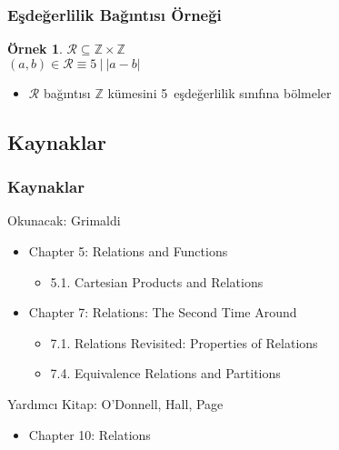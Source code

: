 \documentclass[dvipsnames]{beamer}
\theoremstyle{definition}
\theoremstyle{example}
\newtheorem{ornek}[theorem]{Örnek}
\theoremstyle{plain}
\begin{document}
\begin{frame}
  \frametitle{Eşdeğerlilik Bağıntısı Örneği}

  \begin{ornek}
    $\mathcal{R} \subseteq \mathbb{Z} \times \mathbb{Z}$\\
    $(a,b) \in \mathcal{R} \equiv 5~|~|a - b|$

    \bigskip
    \begin{itemize}
      \item $\mathcal{R}$ bağıntısı $\mathbb{Z}$ kümesini 5~eşdeğerlilik sınıfına
        bölmeler
    \end{itemize}
  \end{ornek}
\end{frame}

\subsection*{Kaynaklar}

\begin{frame}
  \frametitle{Kaynaklar}

  \begin{block}{Okunacak: Grimaldi}
    \begin{itemize}
      \item Chapter 5: Relations and Functions
      \begin{itemize}
        \item 5.1. \alert{Cartesian Products and Relations}
      \end{itemize}
      \item Chapter 7: Relations: The Second Time Around
      \begin{itemize}
        \item 7.1. \alert{Relations Revisited: Properties of Relations}
        \item 7.4. \alert{Equivalence Relations and Partitions}
      \end{itemize}
    \end{itemize}
  \end{block}

  \begin{block}{Yardımcı Kitap: O'Donnell, Hall, Page}
    \begin{itemize}
      \item Chapter 10: Relations
    \end{itemize}
  \end{block}
\end{frame}
\end{document}
